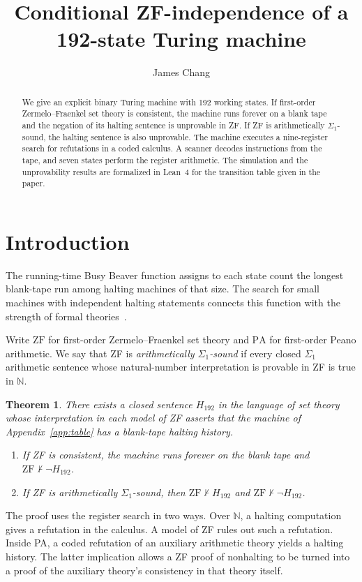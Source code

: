 \documentclass[11pt,letterpaper]{article}
\title{Conditional ZF-independence of a 192-state Turing machine}
\author{James Chang}
\date{}
\newtheorem{theorem}{Theorem}
\newcommand{\ZF}{\mathrm{ZF}}
\newcommand{\PA}{\mathrm{PA}}
\newcommand{\N}{\mathbb{N}}
\newcommand{\Halt}{H_{192}}
\begin{document}
\maketitle

\begin{abstract}
We give an explicit binary Turing machine with 192 working states.
If first-order Zermelo--Fraenkel set theory is consistent, the machine
runs forever on a blank tape and the negation of its halting sentence
is unprovable in ZF. If ZF is arithmetically $\Sigma_1$-sound, the
halting sentence is also unprovable. The machine executes a
nine-register search for refutations in a coded calculus. A scanner
decodes instructions from the tape, and seven states perform the
register arithmetic. The simulation and the unprovability results
are formalized in Lean~4 for the transition table given in the paper.
\end{abstract}

\section{Introduction}

The running-time Busy Beaver function assigns to each state count
the longest blank-tape run among halting machines of that size. The
search for small machines with independent halting statements connects
this function with the strength of formal theories~\cite{yedidia-aaronson}.

Write $\ZF$ for first-order Zermelo--Fraenkel set theory and $\PA$
for first-order Peano arithmetic. We say that ZF is
\emph{arithmetically $\Sigma_1$-sound} if every closed $\Sigma_1$
arithmetic sentence whose natural-number interpretation is provable
in ZF is true in $\N$.

\begin{theorem}\label{thm:main}
There exists a closed sentence $\Halt$ in the language of set theory
whose interpretation in each model of ZF asserts that the machine of
Appendix~\ref{app:table} has a blank-tape halting history.
\begin{enumerate}
\item If ZF is consistent, the machine runs forever on the blank tape
and $\ZF\nvdash\neg\Halt$.
\item If ZF is arithmetically $\Sigma_1$-sound, then
$\ZF\nvdash\Halt$ and $\ZF\nvdash\neg\Halt$.
\end{enumerate}
\end{theorem}

The proof uses the register search in two ways. Over $\N$, a halting
computation gives a refutation in the calculus. A model of ZF
rules out such a refutation. Inside PA, a coded refutation of an
auxiliary arithmetic theory yields a halting history. The latter
implication allows a ZF proof of nonhalting to be turned into a
proof of the auxiliary theory's consistency in that theory itself.
\end{document}
